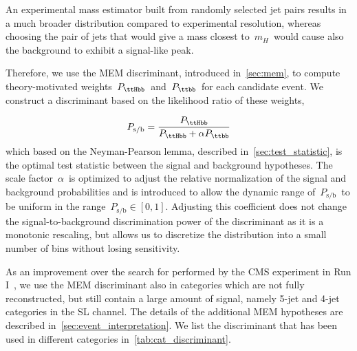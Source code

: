 An experimental mass estimator built from randomly selected jet pairs results in a much broader distribution compared to experimental resolution, whereas choosing the pair of jets that would give a mass closest to~$m_H$~would cause also the background to exhibit a signal-like peak.

Therefore, we use the MEM discriminant, introduced in~\cref{sec:mem}, to compute theory-motivated weights~$P_{\ttHbb}$~and~$P_{\ttbb}$~for each candidate event. We construct a discriminant based on the likelihood ratio of these weights,

\begin{equation}
\label{eq:mem_ratio}
P_{\mathrm{s}/\mathrm{b}} = \frac{P_{\ttHbb}}{P_{\ttHbb} + \alpha P_{\ttbb}}
\end{equation} 
which based on the Neyman-Pearson lemma, described in~\cref{sec:test_statistic}, is the optimal test statistic between the signal and background hypotheses. The scale factor~$\alpha$~is optimized to adjust the relative normalization of the signal and background probabilities and is introduced to allow the dynamic range of~$P_{\mathrm{s}/\mathrm{b}}$~to be uniform in the range~$P_{\mathrm{s}/\mathrm{b}} \in [0, 1]$. Adjusting this coefficient does not change the signal-to-background discrimination power of the discriminant as it is a monotonic rescaling, but allows us to discretize the distribution into a small number of bins without losing sensitivity.

As an improvement over the search for \ttHbb performed by the CMS experiment in Run I~\cite{Khachatryan:2015ila}, we use the MEM discriminant also in categories which are not fully reconstructed, but still contain a large amount of signal, namely 5-jet and 4-jet categories in the SL channel. The details of the additional MEM hypotheses are described in~\cref{sec:event_interpretation}. We list the discriminant that has been used in different categories in~\cref{tab:cat_discriminant}. 


